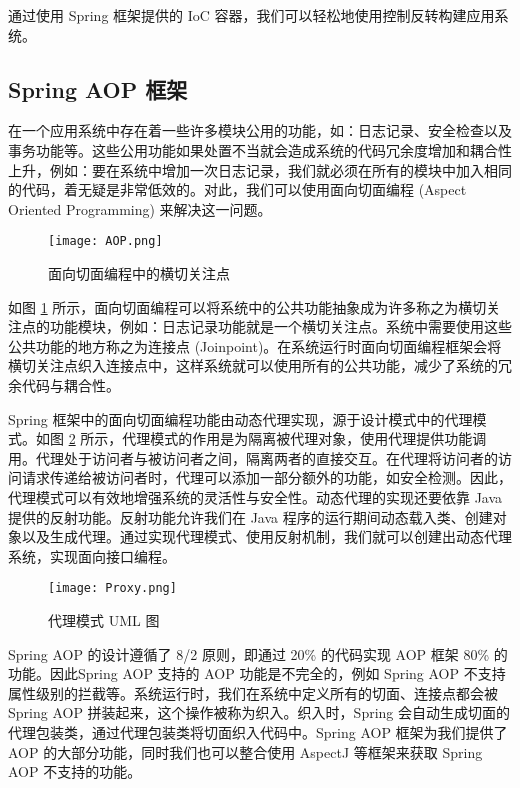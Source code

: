 通过使用 Spring 框架提供的 IoC 容器，我们可以轻松地使用控制反转构建应用系统。

\subsection{Spring AOP 框架}

在一个应用系统中存在着一些许多模块公用的功能，如：日志记录、安全检查以及事务功能等。这些公用功能如果处置不当就会造成系统的代码冗余度增加和耦合性上升，例如：要在系统中增加一次日志记录，我们就必须在所有的模块中加入相同的代码，着无疑是非常低效的。对此，我们可以使用面向切面编程 (Aspect Oriented Programming) 来解决这一问题。

\begin{figure}[!ht]
    \centering
    \texttt{[image: AOP.png]}
    \caption{面向切面编程中的横切关注点}
    \label{fig:AOP}
\end{figure}

如图 \ref{fig:AOP} 所示，面向切面编程可以将系统中的公共功能抽象成为许多称之为横切关注点的功能模块，例如：日志记录功能就是一个横切关注点。系统中需要使用这些公共功能的地方称之为连接点 (Joinpoint)\cite{walls2005spring}。在系统运行时面向切面编程框架会将横切关注点织入连接点中，这样系统就可以使用所有的公共功能，减少了系统的冗余代码与耦合性。

Spring 框架中的面向切面编程功能由动态代理实现，源于设计模式中的代理模式。如图 \ref{fig:Proxy} 所示，代理模式的作用是为隔离被代理对象，使用代理提供功能调用\cite{gamma1995design}。代理处于访问者与被访问者之间，隔离两者的直接交互。在代理将访问者的访问请求传递给被访问者时，代理可以添加一部分额外的功能，如安全检测。因此，代理模式可以有效地增强系统的灵活性与安全性。动态代理的实现还要依靠 Java 提供的反射功能。反射功能允许我们在 Java 程序的运行期间动态载入类、创建对象以及生成代理。通过实现代理模式、使用反射机制，我们就可以创建出动态代理系统，实现面向接口编程\cite{walls2005spring,walls2016spring}。

\begin{figure}[!ht]
    \centering
    \texttt{[image: Proxy.png]}
    \caption{代理模式 UML 图}
    \label{fig:Proxy}
\end{figure}

Spring AOP 的设计遵循了 8/2 原则，即通过 20\% 的代码实现 AOP
 框架 80\% 的功能。因此Spring AOP 支持的 AOP 功能是不完全的，例如 Spring AOP 不支持属性级别的拦截等。系统运行时，我们在系统中定义所有的切面、连接点都会被 Spring AOP 拼装起来，这个操作被称为织入\cite{spring2019}。织入时，Spring 会自动生成切面的代理包装类，通过代理包装类将切面织入代码中。Spring AOP 框架为我们提供了 AOP 的大部分功能，同时我们也可以整合使用 AspectJ 等框架来获取 Spring AOP 不支持的功能。
 
